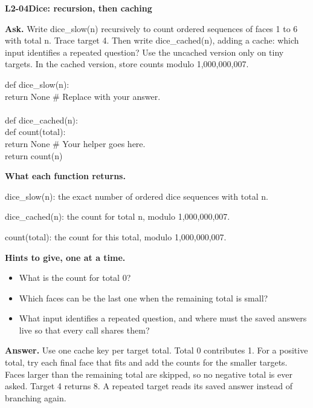 \documentclass[11pt,a4paper]{article}
\begin{document}
\noindent\begin{minipage}{\textwidth}
{\color{teal}\textbf{L2-04}}\quad \textbf{Dice: recursion, then caching}\par\smallskip
\textbf{Ask.} Write dice\_slow(n) recursively to count ordered sequences of faces 1 to 6 with total n. Trace target 4. Then write dice\_cached(n), adding a cache: which input identifies a repeated question? Use the uncached version only on tiny targets. In the cached version, store counts modulo 1,000,000,007.\par\smallskip
\par{}\par\smallskip\noindent\colorbox{codepaper}{\parbox{\dimexpr\linewidth-2\fboxsep\relax}{\small\ttfamily\raggedright def dice\_slow(n):\\\hspace*{2.4em}return None  \# Replace with your answer.\\\mbox{}\\def dice\_cached(n):\\\hspace*{2.4em}def count(total):\\\hspace*{4.8em}return None  \# Your helper goes here.\\\hspace*{2.4em}return count(n)}}\par
{\small\textbf{What each function returns.}\par dice\_slow(n): the exact number of ordered dice sequences with total n.\par dice\_cached(n): the count for total n, modulo 1,000,000,007.\par count(total): the count for this total, modulo 1,000,000,007.\par }
{\small\textbf{Hints to give, one at a time.}}\begin{itemize}\item What is the count for total 0?\item Which faces can be the last one when the remaining total is small?\item What input identifies a repeated question, and where must the saved answers live so that every call shares them?\end{itemize}
\textbf{Answer.} Use one cache key per target total. Total 0 contributes 1. For a positive total, try each final face that fits and add the counts for the smaller targets. Faces larger than the remaining total are skipped, so no negative total is ever asked. Target 4 returns 8. A repeated target reads its saved answer instead of branching again.\par\smallskip

\end{minipage}
\end{document}
